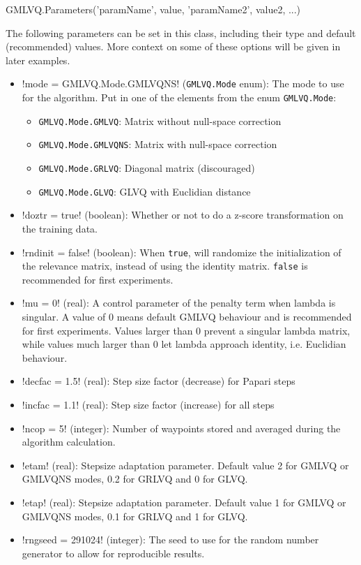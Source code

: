 \documentclass[a4paper,10pt]{article}
\begin{document}
\begin{mats}
GMLVQ.Parameters('paramName', value, 'paramName2', value2, ...)
\end{mats}
%
The following parameters can be set in this class, including their type and default (recommended) values. More context on some of these options will be given in later examples.
\begin{itemize}
\item \mat!mode = GMLVQ.Mode.GMLVQNS! ({\tt GMLVQ.Mode} enum): The mode to use for the algorithm. Put in one of the elements from the enum {\tt GMLVQ.Mode}:
	\begin{itemize}
	\item {\tt GMLVQ.Mode.GMLVQ}: Matrix without null-space correction
	\item {\tt GMLVQ.Mode.GMLVQNS}: Matrix with null-space correction
	\item {\tt GMLVQ.Mode.GRLVQ}: Diagonal matrix (discouraged)
	\item {\tt GMLVQ.Mode.GLVQ}: GLVQ with Euclidian distance
	\end{itemize}
\item \mat!doztr = true! (boolean): Whether or not to do a z-score transformation on the training data.
\item \mat!rndinit = false! (boolean): When {\tt true}, will randomize the initialization of the relevance matrix, instead of using the identity matrix. {\tt false} is recommended for first experiments.
\item \mat!mu = 0! (real): A control parameter of the penalty term when lambda is singular. A value of 0 means default GMLVQ behaviour and is recommended for first experiments. Values larger than 0 prevent a singular lambda matrix, while values much larger than 0 let lambda approach identity, i.e. Euclidian behaviour.
\item \mat!decfac = 1.5! (real): Step size factor (decrease) for Papari steps
\item \mat!incfac = 1.1! (real): Step size factor (increase) for all steps
\item \mat!ncop = 5! (integer): Number of waypoints stored and averaged during the algorithm calculation.
\item \mat!etam! (real): Stepsize adaptation parameter. Default value 2 for GMLVQ or GMLVQNS modes, 0.2 for GRLVQ and 0 for GLVQ.
\item \mat!etap! (real): Stepsize adaptation parameter. Default value 1 for GMLVQ or GMLVQNS modes, 0.1 for GRLVQ and 1 for GLVQ.
\item \mat!rngseed = 291024! (integer): The seed to use for the random number generator to allow for reproducible results.

\end{itemize}
\end{document}
